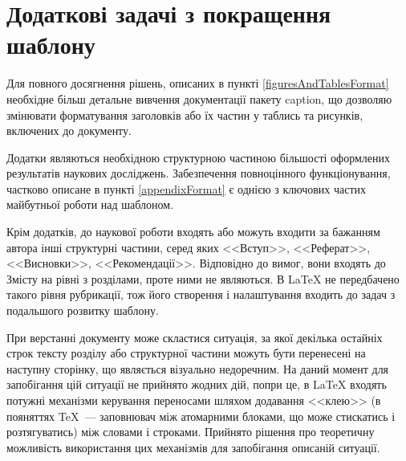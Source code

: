 \section{Додаткові задачі з покращення шаблону}

Для повного досягнення рішень, описаних в пункті \ref{figuresAndTablesFormat} необхідне більш детальне вивчення документації пакету caption, що дозволяю змінювати форматування заголовків або їх частин у таблись та рисунків, включених до документу.

Додатки являються необхідною структурною частиною більшості оформлених результатів наукових досліджень. Забезпечення повноцінного функціонування, частково описане в пункті \ref{appendixFormat} є однією з ключових частих майбутньої роботи над шаблоном.

Крім додатків, до наукової роботи входять або можуть входити за бажанням автора інші структурні частини, серед яких <<Вступ>>, <<Реферат>>, <<Висновки>>, <<Рекомендації>>. Відповідно до вимог, вони входять до Змісту на рівні з розділами, проте ними не являються. В \LaTeX{} не передбачено такого рівня рубрикації, тож його створення і налаштування входить до задач з подальшого розвитку шаблону.

При верстанні документу може скластися ситуація, за якої декілька остайніх строк тексту розділу або структурної частини можуть бути перенесені на наступну сторінку, що являється візуально недоречним. На даний момент для запобігання цій ситуації не прийнято жодних дій, попри це, в \LaTeX{} входять потужні механізми керування переносами шляхом додавання <<клею>> (в пояняттях \TeX{}~--- заповнювач між атомарними блоками, що може стискатись і розтягуватись) між словами і строками. Прийнято рішення про теоретичну можливість використання цих механізмів для запобігання описаній ситуації.

